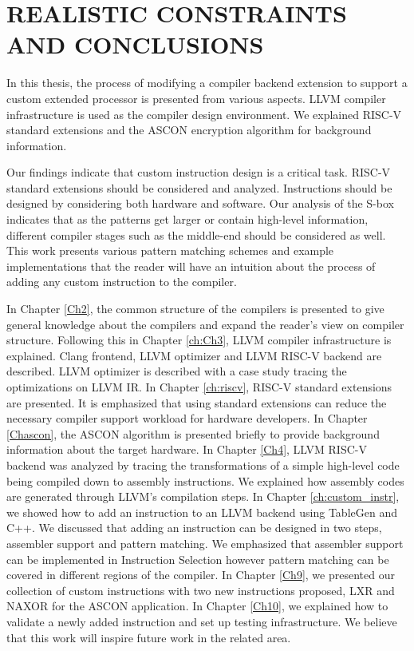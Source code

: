 \chapter{REALISTIC CONSTRAINTS AND CONCLUSIONS}\label{Ch6}

In this thesis, the process of modifying a compiler backend extension to support a custom extended processor is presented from various aspects. LLVM compiler infrastructure is used as the compiler design environment. We explained RISC-V standard extensions and the ASCON encryption algorithm for background information. 

Our findings indicate that custom instruction design is a critical task. RISC-V standard extensions should be considered and analyzed. Instructions should be designed by considering both hardware and software. Our analysis of the S-box indicates that as the patterns get larger or contain high-level information, different compiler stages such as the middle-end should be considered as well. This work presents various pattern matching schemes and example implementations that the reader will have an intuition about the process of adding any custom instruction to the compiler. 

In Chapter \ref{Ch2}, the common structure of the compilers is presented to give general knowledge about the compilers and expand the reader’s view on compiler structure. Following this in Chapter \ref{ch:Ch3}, LLVM compiler infrastructure is explained. Clang frontend, LLVM optimizer and LLVM RISC-V backend are described. LLVM optimizer is described with a case study tracing the optimizations on LLVM IR. In Chapter \ref{ch:riscv}, RISC-V standard extensions are presented. It is emphasized that using standard extensions can reduce the necessary compiler support workload for hardware developers. In Chapter \ref{Chascon}, the ASCON algorithm is presented briefly to provide background information about the target hardware. In Chapter \ref{Ch4}, LLVM RISC-V backend was analyzed by tracing the transformations of a simple high-level code being compiled down to assembly instructions. We explained how assembly codes are generated through LLVM’s compilation steps. In Chapter \ref{ch:custom_instr}, we showed how to add an instruction to an LLVM backend using TableGen and C++. We discussed that adding an instruction can be designed in two steps, assembler support and pattern matching. We emphasized that assembler support can be implemented in Instruction Selection however pattern matching can be covered in different regions of the compiler. In Chapter \ref{Ch9}, we presented our collection of custom instructions with two new instructions proposed, LXR and NAXOR for the ASCON application. In Chapter \ref{Ch10}, we explained how to validate a newly added instruction and set up testing infrastructure. We believe that this work will inspire future work in the related area.
